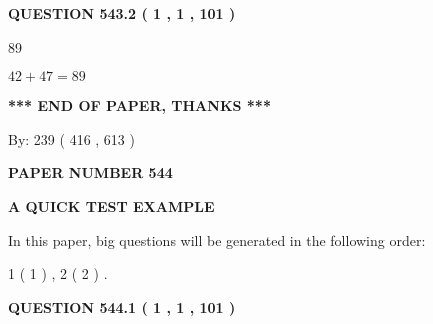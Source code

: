 \documentclass[12pt]{article}
\begin{document}
 
  
\vspace{0.2in}
  
{\textbf{\Large{QUESTION
543.2 
 ( 1 , 1 , 101 )
}}}
  
  
 
 
\noindent{}

89
 
 
 
 
\noindent{}

$ %
42 +  %
47=   %
89$
 
 
   
   
 \vspace{0.2in}
 
   
   
   
   
\vspace{1.0in} 
{\textbf{\large{ *** END OF PAPER, THANKS *** }}} 
   
   
\hspace{1.0in} By: 
 239 ( 416 ,  613 )
   
   
   
   
\newpage 
\setcounter{page}{ 
   544001 } 
   
   
   
   
 {\textbf{ \Large{ PAPER NUMBER  544  }}}
   
   
\vspace{0.2in}
   
   
   
   
   
   
 \vspace{0.2in}
{\LARGE {\textbf{ A QUICK TEST EXAMPLE}}}
   
   
   
\vspace{0.2in}
   
In this paper, big questions will be generated in the following order: 
   
   
   1 ( 1 )
 ,
   2 ( 2 )
 .
  
\vspace{0.2in}
  
{\textbf{\Large{QUESTION
544.1 
 ( 1 , 1 , 101 )
}}}
  
  
 
\end{document}
